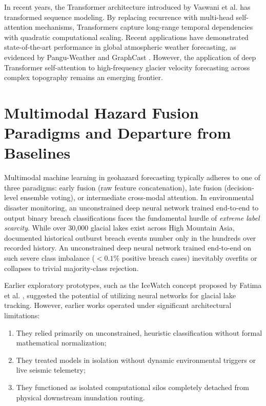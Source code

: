 \documentclass{mnnit}
\begin{document}
In recent years, the Transformer architecture introduced by Vaswani et al. \cite{vaswani2017attention} has transformed sequence modeling. By replacing recurrence with multi-head self-attention mechanisms, Transformers capture long-range temporal dependencies with quadratic computational scaling. Recent applications have demonstrated state-of-the-art performance in global atmospheric weather forecasting, as evidenced by Pangu-Weather \cite{bi2023pangu} and GraphCast \cite{lam2023graphcast}. However, the application of deep Transformer self-attention to high-frequency glacier velocity forecasting across complex topography remains an emerging frontier.

\section{Multimodal Hazard Fusion Paradigms and Departure from Baselines}
Multimodal machine learning in geohazard forecasting typically adheres to one of three paradigms: early fusion (raw feature concatenation), late fusion (decision-level ensemble voting), or intermediate cross-modal attention. In environmental disaster monitoring, an unconstrained deep neural network trained end-to-end to output binary breach classifications faces the fundamental hurdle of \textit{extreme label scarcity}. While over 30,000 glacial lakes exist across High Mountain Asia, documented historical outburst breach events number only in the hundreds over recorded history. An unconstrained deep neural network trained end-to-end on such severe class imbalance ($< 0.1\%$ positive breach cases) inevitably overfits or collapses to trivial majority-class rejection.

Earlier exploratory prototypes, such as the IceWatch concept proposed by Fatima et al. \cite{fatima2025icewatch}, suggested the potential of utilizing neural networks for glacial lake tracking. However, earlier works operated under significant architectural limitations:
\begin{enumerate}
    \item They relied primarily on unconstrained, heuristic classification without formal mathematical normalization;
    \item They treated models in isolation without dynamic environmental triggers or live seismic telemetry;
    \item They functioned as isolated computational silos completely detached from physical downstream inundation routing.
\end{enumerate}
\end{document}
